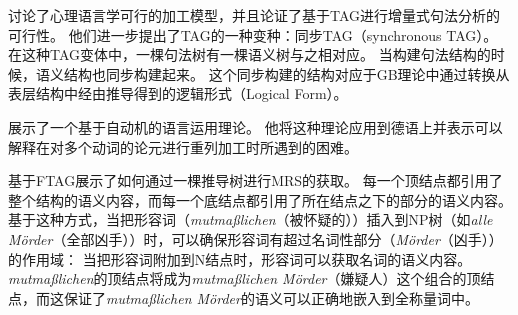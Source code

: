 \citet{SJ93a}讨论了心理语言学可行的加工模型，并且论证了基于TAG进行增量式句法分析的可行性。
他们进一步提出了TAG的一种变种：同步TAG（synchronous TAG\indexstag）。
在这种TAG变体中，一棵句法树有一棵语义树与之相对应。
当构建句法结构的时候，语义结构也同步构建起来。
这个同步构建的结构对应于GB理论中通过转换从表层结构中经由推导得到的逻辑形式（Logical Form）。


\citet[Chapter~6]{Rambow94a}展示了一个基于自动机的语言运用理论。
他将这种理论应用到德语上并表示可以解释在对多个动词的论元进行重列加工时所遇到的困难。

\citet{KR2008a-u}基于FTAG展示了如何通过一棵推导树进行MRS的获取。
每一个顶结点都引用了整个结构的语义内容，而每一个底结点都引用了所在结点之下的部分的语义内容。
基于这种方式，当把形容词（\eg \emph{mutmaßlichen}（被怀疑的））插入到NP树（如\emph{alle Mörder}（全部凶手））时，可以确保形容词有超过名词性部分（\emph{Mörder}（凶手））的作用域：
当把形容词附加到N结点时，形容词可以获取名词的语义内容。
\emph{mutmaßlichen}的顶结点将成为\emph{mutmaßlichen Mörder}（嫌疑人）这个组合的顶结点，而这保证了\emph{mutmaßlichen Mörder}的语义可以正确地嵌入到全称量词中。


